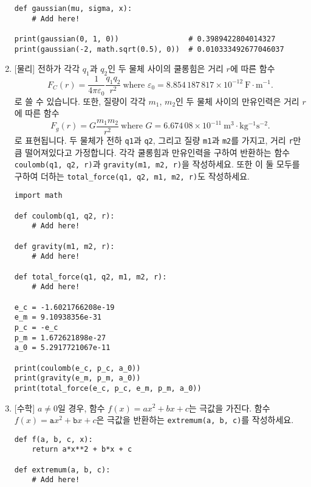 \documentclass[../main.tex]{subfiles}
\begin{document}
\begin{enumerate}
\begin{verbatim}
def gaussian(mu, sigma, x):
    # Add here!

print(gaussian(0, 1, 0))                # 0.3989422804014327
print(gaussian(-2, math.sqrt(0.5), 0))  # 0.010333492677046037
\end{verbatim}

\item \textsf{[물리]} 전하가 각각 $q_1$과 $q_2$인 두 물체 사이의 쿨롱힘은 거리 $r$에 따른 함수
\[
  F_C(r) = \frac{1}{4\pi \varepsilon_0} \frac{q_1 q_2}{r^2}\ \text{where $\varepsilon_0 = 8.854\,187\,817 \times 10^{-12}\ \mathrm{F \cdot m^{-1}}$}.
\]
로 쓸 수 있습니다.
또한, 질량이 각각 $m_1$, $m_2$인 두 물체 사이의 만유인력은 거리 $r$에 따른 함수
\[
  F_g(r) = G \frac{m_1 m_2}{r^2}\ \text{where $G = 6.674\,08 \times 10^{-11}\ \mathrm{m^3 \cdot kg^{-1} s^{-2}}$}.
\]
로 표현됩니다.
두 물체가 전하 \texttt{q1}과 \texttt{q2}, 그리고 질량 \texttt{m1}과
\texttt{m2}를 가지고, 거리 \texttt{r}만큼 떨어져있다고 가정합니다.
각각 쿨롱힘과 만유인력을 구하여 반환하는 함수 \verb|coulomb(q1, q2, r)|과
\verb|gravity(m1, m2, r)|을 작성하세요.
또한 이 둘 모두를 구하여 더하는 \texttt{total\_force(q1, q2, m1, m2, r)}도
작성하세요.
\begin{verbatim}
import math

def coulomb(q1, q2, r):
    # Add here!

def gravity(m1, m2, r):
    # Add here!

def total_force(q1, q2, m1, m2, r):
    # Add here!

e_c = -1.6021766208e-19
e_m = 9.10938356e-31
p_c = -e_c
p_m = 1.672621898e-27
a_0 = 5.2917721067e-11

print(coulomb(e_c, p_c, a_0))
print(gravity(e_m, p_m, a_0))
print(total_force(e_c, p_c, e_m, p_m, a_0))
\end{verbatim}

\item \textsf{[수학]} $a \neq 0$일 경우, 함수 $f(x) = ax^2 + bx + c$는 극값을 가진다.
함수 $f(x) = \texttt{a}x^2 + \texttt{b}x + c$은 극값을 반환하는 
\texttt{extremum(a, b, c)}를 작성하세요.
\begin{verbatim}
def f(a, b, c, x):
    return a*x**2 + b*x + c

def extremum(a, b, c):
    # Add here!


\end{verbatim}
\end{enumerate}
\end{document}
